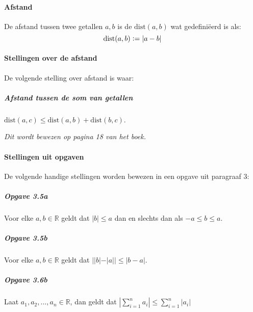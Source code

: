 \paragraph{Afstand} De afstand tussen twee getallen $a,b$ is de $\text{dist}(a,b)$ wat gedefiniëerd is als:
$$\text{dist}(a,b)\vcentcolon=|a-b|$$
\paragraph{Stellingen over de afstand} De volgende stelling over afstand is waar:

\subparagraph{Afstand tussen de som van getallen} $\text{dist}(a,c)\leq\text{dist}(a,b)+\text{dist}(b,c)$.

\textit{Dit wordt bewezen op pagina 18 van het boek.}

\paragraph{Stellingen uit opgaven} De volgende handige stellingen worden bewezen in een opgave uit paragraaf $3$:

\subparagraph{Opgave 3.5a} Voor elke $a,b\in\mathbb{R}$ geldt dat $|b| \leq a$ dan en slechts dan als $-a \leq b \leq a$.

\subparagraph{Opgave 3.5b} Voor elke $a,b\in\mathbb{R}$ geldt dat $||b|-|a|| \leq |b-a|$.

\subparagraph{Opgave 3.6b} Laat $a_{1},a_{2},...,a_{n}\in\mathbb{R}$, dan geldt dat $|\sum_{i=1}^{n}a_{i}|\leq\sum_{i=1}^{n}|a_{i}|$